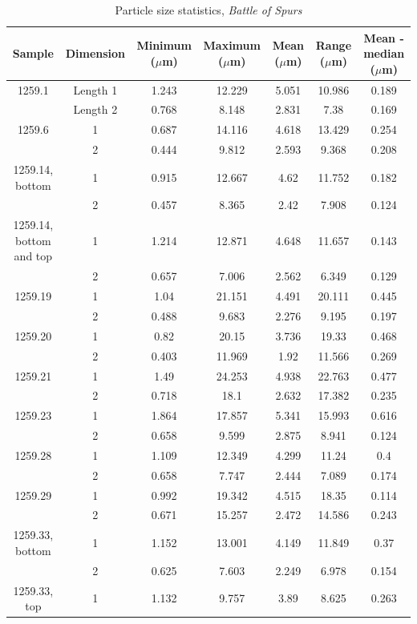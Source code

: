 \begin{table}[H]
\caption{Particle size statistics, \textit{Battle of Spurs}}
\centering
\label{table:stat_summary_bos}
\begin{tabular}{c c c c c c c}
\toprule
Sample & Dimension & Minimum ($\mu$m) & Maximum ($\mu$m) & Mean ($\mu$m) & Range ($\mu$m) & Mean - median ($\mu$m) \\
\midrule
1259.1 & Length 1 & 1.243 & 12.229 & 5.051 & 10.986 & 0.189 \\
~      & Length 2 & 0.768 & 8.148 & 2.831 & 7.38 & 0.169 \\
1259.6 & 1 & 0.687 & 14.116 & 4.618 & 13.429 & 0.254 \\
~      & 2 & 0.444 & 9.812 & 2.593 & 9.368 & 0.208 \\
1259.14, bottom & 1 & 0.915 & 12.667 & 4.62 & 11.752 & 0.182 \\
~      & 2 & 0.457 & 8.365 & 2.42 & 7.908 & 0.124 \\
1259.14, bottom and top & 1 & 1.214 & 12.871 & 4.648 & 11.657 & 0.143 \\
~      & 2 & 0.657 & 7.006 & 2.562 & 6.349 & 0.129 \\
1259.19 & 1 & 1.04 & 21.151 & 4.491 & 20.111 & 0.445 \\
~       & 2 & 0.488 & 9.683 & 2.276 & 9.195 & 0.197 \\
1259.20 & 1 & 0.82 & 20.15 & 3.736 & 19.33 & 0.468 \\
~       & 2 & 0.403 & 11.969 & 1.92 & 11.566 & 0.269 \\
1259.21 & 1 & 1.49 & 24.253 & 4.938 & 22.763 & 0.477 \\
~       & 2 & 0.718 & 18.1 & 2.632 & 17.382 & 0.235 \\
1259.23 & 1 & 1.864 & 17.857 & 5.341 & 15.993 & 0.616 \\
~       & 2 & 0.658 & 9.599 & 2.875 & 8.941 & 0.124 \\
1259.28 & 1 & 1.109 & 12.349 & 4.299 & 11.24 & 0.4 \\
~       & 2 & 0.658 & 7.747 & 2.444 & 7.089 & 0.174 \\
1259.29 & 1 & 0.992 & 19.342 & 4.515 & 18.35 & 0.114 \\
~       & 2 & 0.671 & 15.257 & 2.472 & 14.586 & 0.243 \\
1259.33, bottom & 1 & 1.152 & 13.001 & 4.149 & 11.849 & 0.37 \\
~       & 2 & 0.625 & 7.603 & 2.249 & 6.978 & 0.154 \\
1259.33, top & 1 & 1.132 & 9.757 & 3.89 & 8.625 & 0.263 \\

\end{tabular}
\end{table}
